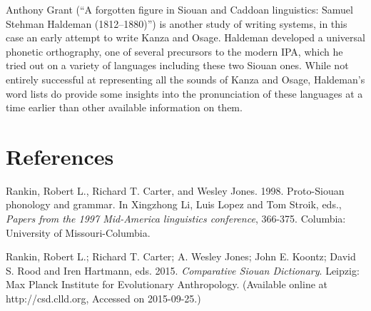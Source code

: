 \begin{refsection}
Anthony Grant (``A forgotten figure in Siouan and Caddoan linguistics: Samuel Stehman Haldeman (1812--1880)'') is another study of writing systems, in this case an early attempt to write Kanza and Osage. Haldeman developed a universal phonetic orthography, one of several precursors to the modern IPA, which he tried out on a variety of languages including these two Siouan ones. While not entirely successful at representing all the sounds of Kanza and Osage, Haldeman's word lists do provide some insights into the pronunciation of these languages at a time earlier than other available information on them. 


\section*{References}

\printbibliography[heading=subbibliography]

\begin{reflist}



Rankin, Robert L., Richard T. Carter, and Wesley Jones. 1998. Proto-Siouan phonology and grammar. In Xingzhong Li, Luis Lopez and Tom Stroik, eds., \textit{Papers from the 1997 Mid-America linguistics conference}, 366-375. Columbia: University of Missouri-Columbia.



Rankin, Robert L.; Richard T. Carter; A. Wesley Jones; John E. Koontz; David S. Rood and Iren Hartmann, eds. 2015. \textit{Comparative Siouan Dictionary}. Leipzig: Max Planck Institute for Evolutionary Anthropology. (Available online at http://csd.clld.org, Accessed on 2015-09-25.)
\end{reflist}
\end{refsection}

